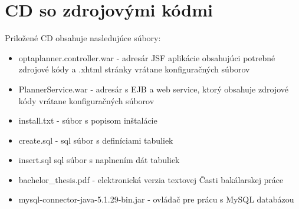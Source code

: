 \chapter{CD so zdrojovými kódmi}
{
	Priložené CD obsahuje nasledujúce súbory:
	\begin{itemize}
	\item optaplanner.controller.war - adresár JSF aplikácie obsahujúci potrebné zdrojové kódy a .xhtml stránky vrátane konfiguračných súborov
	\item PlannerService.war - adresár s EJB a web service, ktorý obsahuje zdrojové kódy vrátane konfiguračných súborov
	\item install.txt - súbor s popisom inštalácie
	\item create.sql - sql súbor s definíciami tabuliek
	\item insert.sql sql súbor s naplnením dát tabuliek
	\item bachelor\_thesis.pdf - elektronická verzia textovej Časti bakálarskej práce
	\item mysql-connector-java-5.1.29-bin.jar - ovládač pre prácu s MySQL databázou
	\end{itemize}
}


